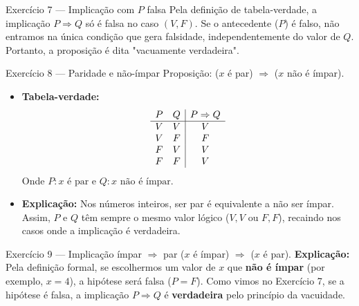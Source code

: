 \documentclass[12pt]{article}
\begin{document}
\begin{block}{Exercício 7 — Implicação com $P$ falsa}
Pela definição de tabela-verdade, a implicação $P \Rightarrow Q$ só é falsa no caso $(V,F)$. Se o antecedente ($P$) é falso, não entramos na única condição que gera falsidade, independentemente do valor de $Q$. Portanto, a proposição é dita "vacuamente verdadeira".
\end{block}

\begin{block}{Exercício 8 — Paridade e não-ímpar}
Proposição: ($x$ é par) $\Rightarrow$ ($x$ não é ímpar).
\begin{itemize}
    \item \textbf{Tabela-verdade:}
    \[
    \begin{array}{c c | c}
    P & Q & P \Rightarrow Q \\
    \hline
    V & V & V \\
    V & F & F \\
    F & V & V \\
    F & F & V
    \end{array}
    \]
    Onde $P: x \text{ é par}$ e $Q: x \text{ não é ímpar}$.
    \item \textbf{Explicação:} Nos números inteiros, ser par é equivalente a não ser ímpar. Assim, $P$ e $Q$ têm sempre o mesmo valor lógico ($V,V$ ou $F,F$), recaindo nos casos onde a implicação é verdadeira.
\end{itemize}
\end{block}

\begin{block}{Exercício 9 — Implicação ímpar $\Rightarrow$ par}
($x$ é ímpar) $\Rightarrow$ ($x$ é par).
\textbf{Explicação:} Pela definição formal, se escolhermos um valor de $x$ que \textbf{não é ímpar} (por exemplo, $x=4$), a hipótese será falsa ($P=F$). Como vimos no Exercício 7, se a hipótese é falsa, a implicação $P \Rightarrow Q$ é \textbf{verdadeira} pelo princípio da vacuidade.
\end{block}
\end{document}
